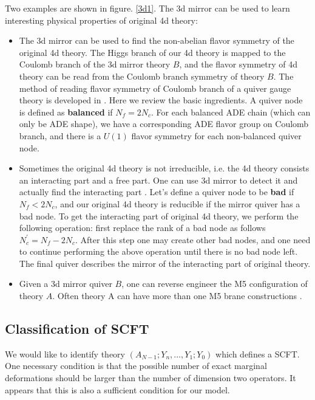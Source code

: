 \documentclass[a4paper,11pt]{article}
\begin{document}
Two examples are shown in figure. \ref{3d1}. The 3d mirror can be used to learn interesting physical properties of original 4d theory:
\begin{itemize}
\item The 3d mirror can be used to find the non-abelian flavor symmetry of the original 4d theory. The Higgs branch of our 4d theory is mapped to the Coulomb branch of 
the 3d mirror theory $B$, and the flavor symmetry of 4d theory can be read from the Coulomb branch symmetry of theory $B$. The method of reading flavor symmetry of Coulomb branch of a quiver gauge theory 
is developed in \cite{Gaiotto:2008ak}. Here we review the basic ingredients. A quiver node is defined as \textbf{balanced} if $N_f=2N_c$. For each balanced ADE chain (which can only be ADE shape), we have 
a corresponding ADE flavor group on Coulomb branch, and there is a $U(1)$ flavor symmetry for each non-balanced quiver node. 
\item  Sometimes the original 4d theory is not irreducible, i.e. the 4d theory consists an interacting part and a free part. One can use 3d mirror to detect it and actually find the interacting part \cite{Nanopoulos:2010bv}. Let's 
define a quiver node to be \textbf{bad} if $N_f<2N_c$, and our original 4d theory is reducible if the mirror quiver has a bad node. To get the interacting part of original 4d theory, we perform the following 
operation: first replace the rank  of a bad node as follows $N_c^{'}=N_f-2N_c$. After this step one may create other bad nodes, and one need to continue performing the above operation until there 
is no bad node left. The final quiver describes the mirror of the interacting part of original theory. 
\item Given a 3d mirror quiver $B$, one can reverse engineer the M5 configuration of theory $A$. Often theory A can have more than one M5 brane constructions \cite{Xie:2012hs, boalch2008irregular}. 
\end{itemize}


\subsection{Classification of SCFT}
We would like to identify theory $(A_{N-1}; Y_n,\ldots, Y_1; Y_0)$ which defines a SCFT. One necessary condition is that the possible number 
of exact marginal deformations should be larger than the number of dimension two operators. It appears that this is also a sufficient condition for our model.
\end{document}
